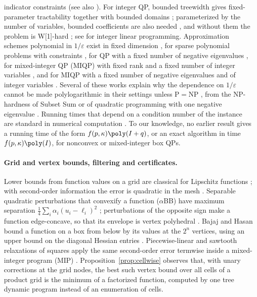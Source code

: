 indicator constraints (see also \cite{BienstockChen2024}). For integer QP,
bounded treewidth gives fixed-parameter tractability together with bounded
domains \cite{EibenEtAl2019}; parameterized by the number of variables,
bounded coefficients are also needed \cite{Lokshtanov2015}, and without them
the problem is W[1]-hard \cite{Herrmann2026}; see \cite{GanianOrdyniak2018}
for integer linear programming. Approximation schemes polynomial in
$1/\varepsilon$ exist in fixed dimension
\cite{DeLoeraEtAl2008,HildebrandWeismantelZemmer2016}, for sparse polynomial
problems with constraints \cite[Theorem~4]{BienstockMunoz2018}, for QP with a
fixed number of negative eigenvalues \cite{Vavasis1992}, for mixed-integer
QP (MIQP) with fixed rank and a fixed number of integer variables
\cite{DelPia2023}, and for MIQP with a fixed number of negative eigenvalues
and of integer variables
\cite{DelPia2026Jacobi}. Several of these works explain why the dependence on
$1/\varepsilon$ cannot be made polylogarithmic in their settings unless
P${}={}$NP \cite{BienstockMunoz2018,Vavasis1992,DelPia2026Jacobi}, from the
NP-hardness of Subset Sum or of quadratic programming with one negative
eigenvalue \cite{PardalosVavasis1991}. Running times that depend on a
condition number of the instance are standard in numerical computation
\cite{BurgisserCucker2013}. To our knowledge, no earlier result gives a
running time of the form $f(p,\kappa)\poly(I+q)$, or an exact algorithm in
time $f(p,\kappa)\poly(I)$, for nonconvex or mixed-integer box QPs.

\paragraph{Grid and vertex bounds, filtering and certificates.}
Lower bounds from function values on a grid are classical for Lipschitz
functions \cite{Piyavskii1972,Shubert1972,Nesterov2004}; with second-order
information the error is quadratic in the mesh
\cite{BreimanCutler1993,DeKlerkLasserreLaurentSun2017}. Separable quadratic
perturbations that convexify a function ($\alpha$BB) have maximum separation
$\frac14\sum_i\alpha_i(u_i-\ell_i)^2$
\cite{MaranasFloudas1994,AndroulakisMaranasFloudas1995,AdjimanEtAl1998};
perturbations of the opposite sign make a function edge-concave, so that its
envelope is vertex polyhedral
\cite{Tardella2004,MeyerFloudas2005,Hasan2018,MisenerFloudas2012}. Bajaj and
Hasan bound a function on a box from below by its values at the $2^n$
vertices, using an upper bound on the diagonal Hessian entries
\cite{BajajHasan2020}. Piecewise-linear and sawtooth relaxations of squares
apply the same second-order error termwise inside a mixed-integer program (MIP)
\cite{BeachHildebrandHuchette2022,BeachEtAl2024,DongLuo2018}.
Proposition~\ref{prop:cellwise} observes that, with unary corrections at the
grid nodes, the best such vertex bound over all cells of a product grid is
the minimum of a factorized function, computed by one tree dynamic program
instead of an enumeration of cells.

